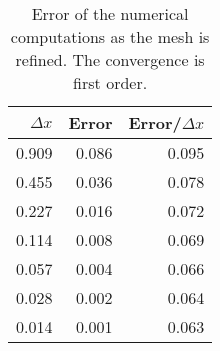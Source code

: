 
\begin{table} [h] \begin{center}
\begin{tabular}{|r|r|r|} \hline
$\Delta x$ & Error & Error/$\Delta x$ \\ \hline
0.909 & 0.086 & 0.095 \\ \hline
0.455 & 0.036 & 0.078 \\ \hline
0.227 & 0.016 & 0.072 \\ \hline
0.114 & 0.008 & 0.069 \\ \hline
0.057 & 0.004 & 0.066 \\ \hline
0.028 & 0.002 & 0.064 \\ \hline
0.014 & 0.001 & 0.063 \\ \hline
\end{tabular} \end{center}
\caption{Error of the numerical computations as the mesh is refined. The convergence is first order.\label{tab:conv}}
\end{table}
